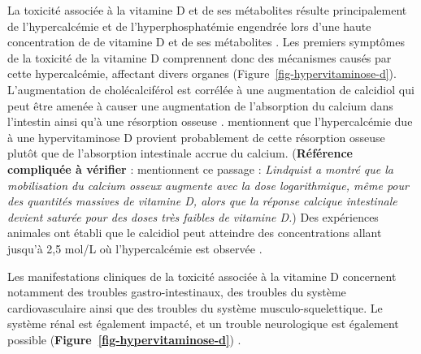 \documentclass[
  a4paper,
  DIV=11,
  numbers=noendperiod,
  listof=totoc]{scrreprt}
\begin{document}
La toxicité associée à la vitamine D et de ses métabolites résulte
principalement de l'hypercalcémie et de l'hyperphosphatémie engendrée
lors d'une haute concentration de de vitamine D et de ses métabolites
\autocites[ ]{DeLuca.2011}{Janoušek.2022,Jones.2008,IOM.2011}. Les
premiers symptômes de la toxicité de la vitamine D comprennent donc des
mécanismes causés par cette hypercalcémie, affectant divers organes
(Figure~\ref{fig-hypervitaminose-d}). L'augmentation de cholécalciférol
est corrélée à une augmentation de calcidiol qui peut être amenée à
causer une augmentation de l'absorption du calcium dans l'intestin ainsi
qu'à une résorption osseuse \autocite{Jones.2008,IOM.2011}.
\textcite{Shepard.1980} mentionnent que l'hypercalcémie due à une
hypervitaminose D provient probablement de cette résorption osseuse
plutôt que de l'absorption intestinale accrue du calcium.
(\textbf{Référence compliquée à vérifier} : \textcite{Shepard.1980}
mentionnent ce passage : \emph{Lindquist \autocite{Lindquist.1952} a
montré que la mobilisation du calcium osseux augmente avec la dose
logarithmique, même pour des quantités massives de vitamine D, alors que
la réponse calcique intestinale devient saturée pour des doses très
faibles de vitamine D.}) Des expériences animales ont établi que le
calcidiol peut atteindre des concentrations allant jusqu'à 2,5 mol/L où
l'hypercalcémie est observée \autocite{Jones.2008}.

Les manifestations cliniques de la toxicité associée à la vitamine D
concernent notamment des troubles gastro-intestinaux, des troubles du
système cardiovasculaire ainsi que des troubles du système
musculo-squelettique. Le système rénal est également impacté, et un
trouble neurologique est également possible
(\textbf{Figure~\ref{fig-hypervitaminose-d}}) \autocites[
]{Alshahrani.2013}{Janoušek.2022}.
\end{document}
